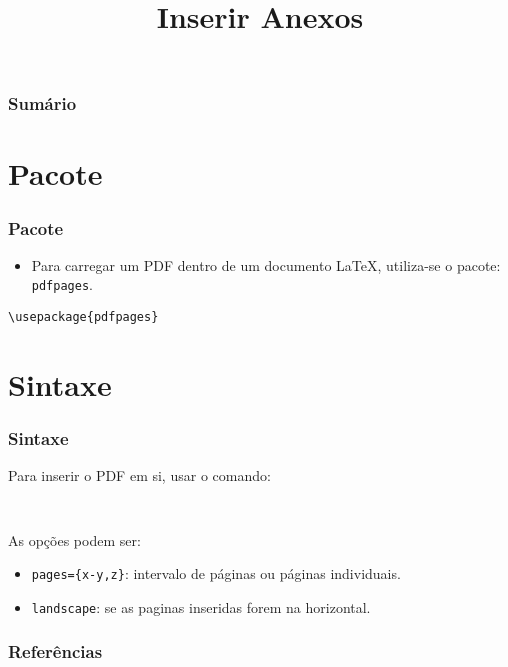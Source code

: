 \documentclass[brazilian]{beamer}
\title{Inserir Anexos}
\begin{document}
    \frame{\titlepage}

    \begin{frame}
        \frametitle{Sumário}
        \tableofcontents
    \end{frame}

\section{Pacote}
\begin{frame}[fragile]
    \frametitle{Pacote}

    \begin{itemize}
        \item Para carregar um PDF dentro de um documento \LaTeX, utiliza-se o pacote: \texttt{pdfpages}. 
    \end{itemize}

\begin{lstlisting}[style=myStyleLatex]
\usepackage{pdfpages}
\end{lstlisting}
\end{frame}

\section{Sintaxe}
\begin{frame}[fragile]
    \frametitle{Sintaxe}

Para inserir o PDF em si, usar o comando:

\begin{lstlisting}[style=myStyleLatex,numbers=none]
    
\end{lstlisting}
As opções podem ser:

\begin{itemize}
    \item \texttt{pages=\{x-y,z\}}: intervalo de páginas ou páginas individuais.
    \item \texttt{landscape}: se as paginas inseridas forem na horizontal.
\end{itemize}

\end{frame}


    \begin{frame}[allowframebreaks]
        \frametitle{Referências}
    
        \nocite{*}
        \printbibliography[keyword={inserirPDF}]
    
    \end{frame}
\end{document}
